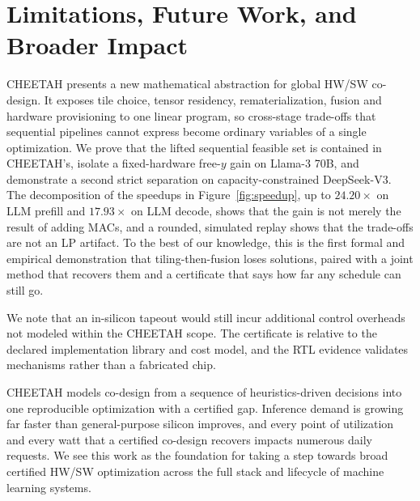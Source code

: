 \section{Limitations, Future Work, and Broader Impact}\label{app:limitations}
CHEETAH presents a new mathematical abstraction for global HW/SW co-design.
It exposes tile choice, tensor residency, rematerialization, fusion and hardware provisioning to one linear program, so cross-stage trade-offs that sequential pipelines cannot express become ordinary variables of a single optimization.
We prove that the lifted sequential feasible set is contained in CHEETAH's, isolate a fixed-hardware free-$y$ gain on Llama-3 70B, and demonstrate a second strict separation on capacity-constrained DeepSeek-V3.
The decomposition of the speedups in Figure~\ref{fig:speedup}, up to $24.20\times$ on LLM prefill and $17.93\times$ on LLM decode, shows that the gain is not merely the result of adding MACs, and a rounded, simulated replay shows that the trade-offs are not an LP artifact.
To the best of our knowledge, this is the first formal and empirical demonstration that tiling-then-fusion loses solutions, paired with a joint method that recovers them and a certificate that says how far any schedule can still go.

We note that an in-silicon tapeout would still incur additional control overheads not modeled within the CHEETAH scope.
The certificate is relative to the declared implementation library and cost model, and the RTL evidence validates mechanisms rather than a fabricated chip.

CHEETAH models co-design from a sequence of heuristics-driven decisions into one reproducible optimization with a certified gap.
Inference demand is growing far faster than general-purpose silicon improves, and every point of utilization and every watt that a certified co-design recovers impacts numerous daily requests.
We see this work as the foundation for taking a step towards broad certified HW/SW optimization across the full stack and lifecycle of machine learning systems.
